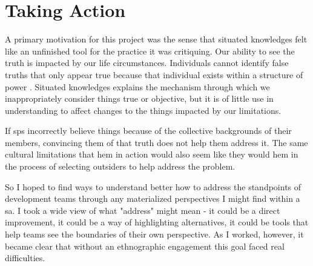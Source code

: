 \documentclass[a4paper,man,natbib,floatsintext]{apa6}
\begin{document}

  \section{Taking Action}
  A primary motivation for this project was the sense that situated knowledges felt like an unfinished tool for the practice it was critiquing. Our ability to see the truth is impacted by our life circumstances. Individuals cannot identify false truths that only appear true because that individual exists within a structure of power \citep{Haraway1988-nh}. Situated knowledges explains the mechanism through which we inappropriately consider things true or objective, but it is of little use in understanding to affect changes to the things impacted by our limitations. 

  If \glspl{sp} incorrectly believe things because of the collective backgrounds of their members, convincing them of that truth does not help them address it. The same cultural limitations that hem in action would also seem like they would hem in the process of selecting outsiders to help address the problem.

  So I hoped to find ways to understand better how to address the standpoints of development teams through any materialized perspectives I might find within a \gls{sa}. I took a wide view of what "address" might mean - it could be a direct improvement, it could be a way of highlighting alternatives, it could be tools that help teams see the boundaries of their own perspective. As I worked, however, it became clear that without an ethnographic engagement this goal faced real difficulties.
\end{document}
